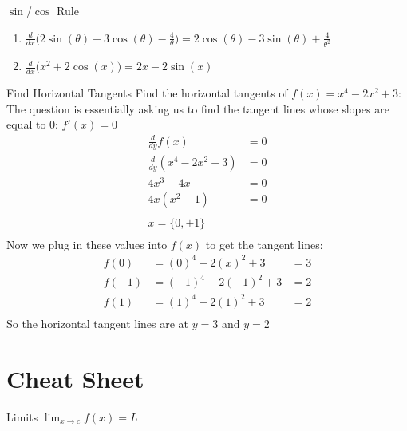 \documentclass{MathNotes}
\begin{document}
\begin{example}{$\sin$/$\cos$ Rule}
    \begin{enumerate}
        \item $\frac{d}{dx}
            \bigl(2\sin(\theta)+3\cos(\theta)-\frac{4}{\theta}\bigr)=
            2\cos(\theta)-3\sin(\theta)+\frac{4}{\theta^2}
            $
        \item $\frac{d}{dx}\bigl(x^2+2\cos(x)\bigr)=2x-2\sin(x)$
    \end{enumerate}
\end{example}

\begin{example}{Find Horizontal Tangents}
    Find the horizontal tangents of $f(x)=x^4-2x^2+3$:
    \br
    The question is essentially asking us to find the tangent lines whose
    slopes are equal to 0: $f'(x)=0$
    \begin{align*}
        \frac{d}{dy}f(x)&=0\\
        \frac{d}{dy}(x^4-2x^2+3)&=0\\
        4x^3-4x &=0\\
        4x(x^2-1)&=0\\
        \\
        x=\{0, \pm 1\}\\
    \end{align*}
    Now we plug in these values into $f(x)$ to get the tangent lines:
    \begin{align*}
        f(0)&=(0)^4-2(x)^2+3&=3\\
        f(-1)&=(-1)^4-2(-1)^2+3&=2\\
        f(1)&=(1)^4-2(1)^2+3&=2\\
    \end{align*}
    So the horizontal tangent lines are at $y=3$ and $y=2$
\end{example}

\newpage
\section{Cheat Sheet}
\begin{multicols}{2}
    \begin{GrayBox}{Limits}{}
        $\lim_{x\to c}f(x)=L$
    \end{GrayBox}
\end{multicols}
\end{document}
